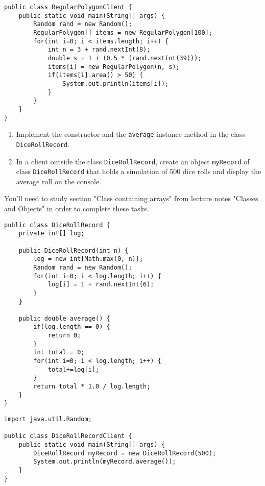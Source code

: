 \begin{questions}
\begin{solution}
\begin{lstlisting}
public class RegularPolygonClient {
	public static void main(String[] args) {
		Random rand = new Random();
		RegularPolygon[] items = new RegularPolygon[100];
		for(int i=0; i < items.length; i++) {
			int n = 3 + rand.nextInt(8);
			double s = 1 + (0.5 * (rand.nextInt(39)));
			items[i] = new RegularPolygon(n, s);
			if(items[i].area() > 50) {
				System.out.println(items[i]);
			}
		}
	}
}
\end{lstlisting}	
\end{solution}

\question 
\begin{enumerate}
  \item Implement the constructor and the \texttt{average} instance method in the class \texttt{DiceRollRecord}.
  \item In a client outside the class \texttt{DiceRollRecord}, create an object \texttt{myRecord} of class \texttt{DiceRollRecord} that holds a simulation of 500 dice rolls and display the average roll on the console.
\end{enumerate}

You'll need to study section "Class containing arrays" from lecture notes "Classes and Objects" in order to complete these tasks.

\begin{solution}
\begin{lstlisting}
public class DiceRollRecord {
	private int[] log;
	
	public DiceRollRecord(int n) {
		log = new int[Math.max(0, n)];
		Random rand = new Random();
		for(int i=0; i < log.length; i++) {
			log[i] = 1 + rand.nextInt(6); 
		}
	}
	
	public double average() {
		if(log.length == 0) {
			return 0;
		}
		int total = 0;
		for(int i=0; i < log.length; i++) {
			total+=log[i];
		}
		return total * 1.0 / log.length;
	}
}
\end{lstlisting}	

\begin{lstlisting}
import java.util.Random;

public class DiceRollRecordClient {
	public static void main(String[] args) {
		DiceRollRecord myRecord = new DiceRollRecord(500);
		System.out.println(myRecord.average());
	}
}
\end{lstlisting}

\end{solution}

\end{questions}

